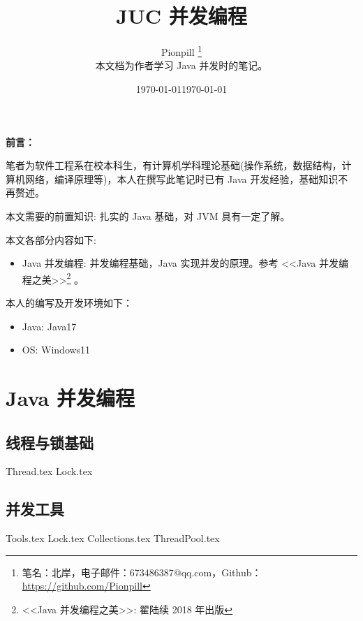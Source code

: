 \documentclass{PionpillNote-book}
\title{JUC 并发编程}
\author{
    Pionpill \footnote{笔名：北岸，电子邮件：673486387@qq.com，Github：\url{https://github.com/Pionpill}} \\
    本文档为作者学习 Java 并发时的笔记。\\
}
\date{\today}
\begin{document}
\pagestyle{plain}
\maketitle

\noindent\textbf{前言：}

笔者为软件工程系在校本科生，有计算机学科理论基础(操作系统，数据结构，计算机网络，编译原理等)，本人在撰写此笔记时已有 Java 开发经验，基础知识不再赘述。

本文需要的前置知识: 扎实的 Java 基础，对 JVM 具有一定了解。

本文各部分内容如下:
\begin{itemize}
    \item Java 并发编程: 并发编程基础，Java 实现并发的原理。参考 <<Java 并发编程之美>>\footnote{<<Java 并发编程之美>>: 翟陆续 2018 年出版} 。
\end{itemize}

本人的编写及开发环境如下：
\begin{itemize}
    \item Java: Java17
    \item OS: Windows11
\end{itemize}

\date{\today}
\newpage

\tableofcontents

\newpage

\setcounter{page}{1} 
\pagestyle{fancy}

\part{Java 并发编程}
\chapter{线程与锁基础}
{Thread.tex}
{Lock.tex}

\chapter{并发工具}
{Tools.tex}
{Lock.tex}
{Collections.tex}
{ThreadPool.tex}
\end{document}
